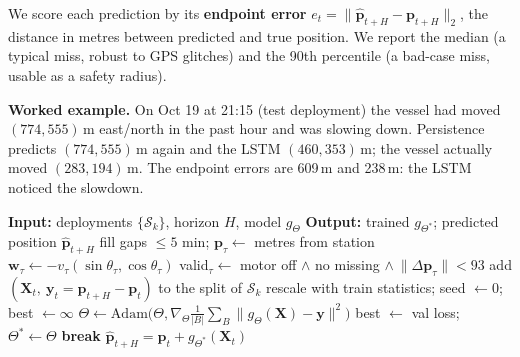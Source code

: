 \documentclass[sigconf]{acmart}
\begin{document}
We score each prediction by its \textbf{endpoint error} $e_t=\|\hat{\mathbf{p}}_{t+H}-\mathbf{p}_{t+H}\|_2$, the distance in metres between predicted and true position. We report the median (a typical miss, robust to GPS glitches) and the 90th percentile (a bad-case miss, usable as a safety radius).

\textbf{Worked example.} On Oct 19 at 21:15 (test deployment) the vessel had moved $(774, 555)$\,m east/north in the past hour and was slowing down. Persistence predicts $(774, 555)$\,m again and the LSTM $(460, 353)$\,m; the vessel actually moved $(283, 194)$\,m. The endpoint errors are 609\,m and 238\,m: the LSTM noticed the slowdown.

\begin{algorithm}[t]
\caption{Drift prediction: build data, train, predict}
\label{alg:drift}
\begin{algorithmic}[1]
\Statex\textbf{Input:} deployments $\{\mathcal{S}_k\}$, horizon $H$, model $g_\Theta$
\Statex\textbf{Output:} trained $g_{\Theta^*}$; predicted position $\hat{\mathbf{p}}_{t+H}$
 
\State fill gaps $\leq5$ min; $\mathbf{p}_\tau\gets$ metres from station
\State $\mathbf{w}_\tau\gets-v_\tau(\sin\theta_\tau,\cos\theta_\tau)$ 
\State valid$_\tau\gets$ motor off $\land$ no missing $\land\ \|\Delta\mathbf{p}_\tau\|<93$
\State add $(\mathbf{X}_t,\ \mathbf{y}_t=\mathbf{p}_{t+H}-\mathbf{p}_t)$ to the split of $\mathcal{S}_k$
\EndFor
\EndFor
\State rescale with train statistics; seed $\gets0$; best $\gets\infty$
 
\State $\Theta\gets\mathrm{Adam}\big(\Theta,\nabla_\Theta\tfrac{1}{|B|}\sum_{B}\|g_\Theta(\mathbf{X})-\mathbf{y}\|^2\big)$
\EndFor
{} best $\gets$ val loss; $\Theta^*\gets\Theta$
 \textbf{break}
\EndIf
\EndFor
\State \Return $\hat{\mathbf{p}}_{t+H}=\mathbf{p}_t+g_{\Theta^*}(\mathbf{X}_t)$ 
\end{algorithmic}
\end{algorithm}
\end{document}
